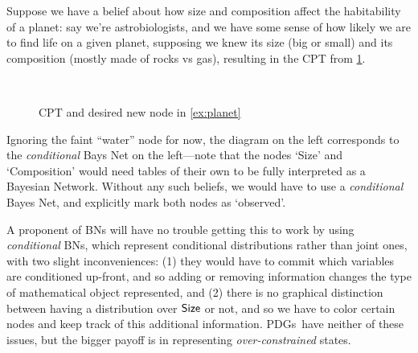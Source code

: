 \documentclass{article}
\newcommand{\MN}{PDG}
\newcommand{\MNs}{\MN s}
\begin{document}
	
	\begin{example} \label{ex:planet}
		Suppose we have a belief about how size and composition affect the habitability of a planet: say we're astrobiologists, and we have some sense of how likely we are to find life on a given planet, supposing we knew its size (big or small) and its composition (mostly made of rocks vs gas), resulting in the CPT from \cref{fig:planet-initial}.
		
		\begin{figure}[h]
			\centering
			~~
			\caption{CPT and desired new node in \cref{ex:planet}}
			\label{fig:planet-initial}
		\end{figure}
		\vspace{1em}
	
		Ignoring the faint ``water'' node for now, the diagram on the left corresponds to the \emph{conditional} Bays Net on the left---note that the nodes `Size' and `Composition' would need tables of their own to be fully interpreted as a Bayesian Network. Without any such beliefs, we would have to use a \emph{conditional} Bayes Net, and explicitly mark both nodes as `observed'.
		
		\begin{vfull}
			A proponent of BNs will have no trouble getting this to work by using \emph{conditional} BNs, which represent conditional distributions rather than joint ones, with two slight inconveniences: (1) they would have to commit which variables are conditioned up-front, and so adding or removing information changes the type of mathematical object represented, and (2) there is no graphical distinction between having a distribution over $\sf Size$ or not, and so we have to color certain nodes and keep track of this additional information. \MNs\ have neither of these issues, but the bigger payoff is in representing \textit{over-constrained} states.
		\end{vfull}


\end{example}
\end{document}
